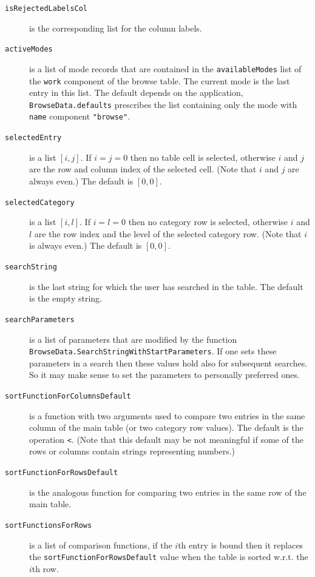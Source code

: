 \documentclass[a4paper,11pt]{report}
\begin{document}
{{{\begin{description}
\item[{\texttt{isRejectedLabelsCol}}]  is the corresponding list for the column labels. 
\item[{\texttt{activeModes}}]  is a list of mode records that are contained in the \texttt{availableModes} list of the \texttt{work} component of the browse table. The current mode is the last entry in this
list. The default depends on the application, \texttt{BrowseData.defaults} prescribes the list containing only the mode with \texttt{name} component \texttt{"browse"}. 
\item[{\texttt{selectedEntry}}]  is a list $[ i, j ]$. If $i = j = 0$ then no table cell is selected, otherwise $i$ and $j$ are the row and column index of the selected cell. (Note that $i$ and $j$ are always even.) The default is $[ 0, 0 ]$. 
\item[{\texttt{selectedCategory}}]  is a list $[ i, l ]$. If $i = l = 0$ then no category row is selected, otherwise $i$ and $l$ are the row index and the level of the selected category row. (Note that $i$ is always even.) The default is $[ 0, 0 ]$. 
\item[{\texttt{searchString}}]  is the last string for which the user has searched in the table. The default
is the empty string. 
\item[{\texttt{searchParameters}}]  is a list of parameters that are modified by the function \texttt{BrowseData.SearchStringWithStartParameters}.  If one sets these parameters in a search then these values hold also for
subsequent searches. So it may make sense to set the parameters to personally
preferred ones. 
\item[{\texttt{sortFunctionForColumnsDefault}}]  is a function with two arguments used to compare two entries in the same
column of the main table (or two category row values). The default is the
operation \texttt{\texttt{}{\textless}}. (Note that this default may be not meaningful if some of the rows or columns
contain strings representing numbers.) 
\item[{\texttt{sortFunctionForRowsDefault}}]  is the analogous function for comparing two entries in the same row of the
main table. 
\item[{\texttt{sortFunctionsForRows}}]  is a list of comparison functions, if the $i$\texttt{}th entry is bound then it replaces the \texttt{sortFunctionForRowsDefault} value when the table is sorted w.r.t. the $i$\texttt{}th row. 

\end{description}}}}
\end{document}
